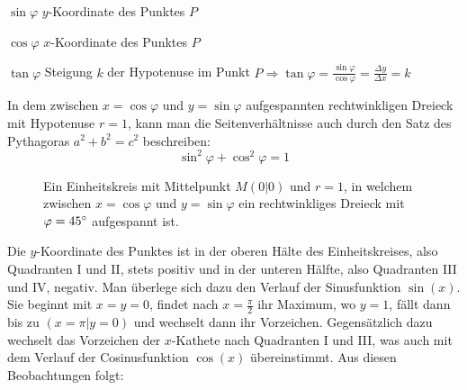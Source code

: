 $\sin \varphi$  $y$-Koordinate des Punktes $P$

$\cos \varphi$  $x$-Koordinate des Punktes $P$

$\tan \varphi$  Steigung $k$ der Hypotenuse im Punkt $P \Rightarrow \tan \varphi = \frac{\sin \varphi}{\cos \varphi} = \frac{\Delta y}{\Delta x} = k$

In dem zwischen $x = \cos \varphi$ und $y = \sin \varphi$ aufgespannten rechtwinkligen Dreieck mit Hypotenuse $r = 1$, kann man die Seitenverh\"{a}ltnisse auch durch den Satz des Pythagoras $a^2 + b^2 = c^2$ beschreiben: $$\sin^2 \varphi + \cos^2 \varphi = 1$$

\pagebreak

\begin{figure}[t!]
\centering
	\caption*{Ein Einheitskreis mit Mittelpunkt $M (0 | 0)$ und $r = 1$, in welchem zwischen $x = \cos \varphi$ und $y = \sin \varphi$ ein rechtwinkliges Dreieck mit $\varphi = 45\degree$ aufgespannt ist.}
\end{figure}

Die  $y$-Koordinate des Punktes ist in der oberen H\"{a}lte des Einheitskreises, also Quadranten I und II, stets positiv und in der unteren H\"{a}lfte, also Quadranten III und IV, negativ. Man \"{u}berlege sich dazu den Verlauf der Sinusfunktion $\sin(x)$. Sie beginnt mit $x = y = 0$, findet nach $x = \frac{\pi}{2}$ ihr Maximum, wo $y = 1$, f\"{a}llt dann bis zu $(x = \pi | y = 0)$ und wechselt dann ihr Vorzeichen. Gegens\"{a}tzlich dazu wechselt das Vorzeichen der $x$-Kathete nach Quadranten I und III, was auch mit dem Verlauf der Cosinusfunktion $\cos(x)$ \"{u}bereinstimmt. Aus diesen Beobachtungen folgt:

